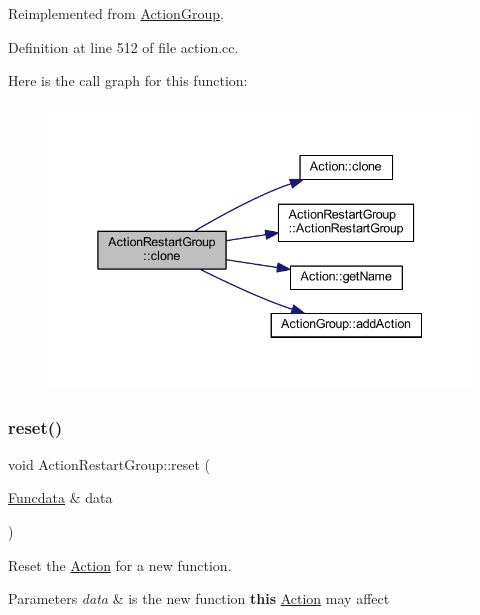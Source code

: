 Reimplemented from \mbox{\hyperlink{class_action_group_ace0724b13474c6c098eb25aee96dd1d6}{Action\+Group}}.



Definition at line 512 of file action.\+cc.

Here is the call graph for this function\+:
\nopagebreak
\begin{figure}[H]
\begin{center}
\leavevmode
\includegraphics[width=338pt]{class_action_restart_group_a2dd3daab632e0a41e64d9515f47c7200_cgraph}
\end{center}
\end{figure}
\mbox{\label{class_action_restart_group_a8a48151026811fbe97f4aa3eecf67cf0}} 
\subsubsection{\texorpdfstring{reset()}{reset()}}
{\footnotesize\ttfamily void Action\+Restart\+Group\+::reset (\begin{DoxyParamCaption}\item[{\mbox{\hyperlink{class_funcdata}{Funcdata}} \&}]{data }\end{DoxyParamCaption})\hspace{0.3cm}{\ttfamily [virtual]}}



Reset the \mbox{\hyperlink{class_action}{Action}} for a new function. 


\begin{DoxyParams}{Parameters}
{\em data} & is the new function {\bfseries{this}} \mbox{\hyperlink{class_action}{Action}} may affect \\
\hline
\end{DoxyParams}


